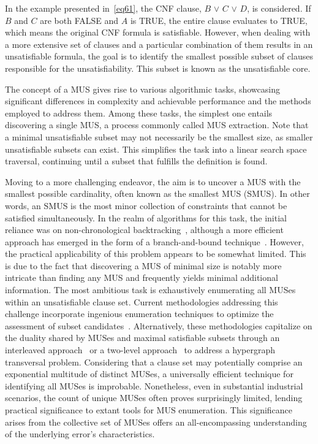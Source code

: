     In the example presented in~\eqref{eq61}, the CNF clause, $B$ $\vee$ $C$ $\vee$ $D$, is considered. If $B$ and $C$ are both FALSE and $A$ is TRUE, the entire clause evaluates to TRUE, which means the original CNF formula is satisfiable.
    However, when dealing with a more extensive set of clauses and a particular combination of them results in an unsatisfiable formula, the goal is to identify the smallest possible subset of clauses responsible for the unsatisfiability. This subset is known as the unsatisfiable core.
    
    The concept of a MUS gives rise to various algorithmic tasks, showcasing significant differences in complexity and achievable performance and the methods employed to address them. Among these tasks, the simplest one entails discovering a single MUS, a process commonly called MUS extraction. Note that a minimal unsatisfiable subset may not necessarily be the smallest size, as smaller unsatisfiable subsets can exist. This simplifies the task into a linear search space traversal, continuing until a subset that fulfills the definition is found. 

    Moving to a more challenging endeavor, the aim is to uncover a MUS with the smallest possible cardinality, often known as the smallest MUS (SMUS). In other words, an SMUS is the most minor collection of constraints that cannot be satisfied simultaneously.
    In the realm of algorithms for this task, the initial reliance was on non-chronological backtracking~\cite{lynce2004computing}, although a more efficient approach has emerged in the form of a branch-and-bound technique~\cite{mneimneh2005branch}. However, the practical applicability of this problem appears to be somewhat limited. This is due to the fact that discovering a MUS of minimal size is notably more intricate than finding any MUS and frequently yields minimal additional information.
    The most ambitious task is exhaustively enumerating all MUSes within an unsatisfiable clause set. Current methodologies addressing this challenge incorporate ingenious enumeration techniques to optimize the assessment of subset candidates~\cite{de2003finding}. Alternatively, these methodologies capitalize on the duality shared by MUSes and maximal satisfiable subsets through an interleaved approach~\cite{bailey2005discovery} or a two-level approach~\cite{liffiton2008algorithms} to address a hypergraph transversal problem. Considering that a clause set may potentially comprise an exponential multitude of distinct MUSes, a universally efficient technique for identifying all MUSes is improbable. Nonetheless, even in substantial industrial scenarios, the count of unique MUSes often proves surprisingly limited, lending practical significance to extant tools for MUS enumeration. This significance arises from the collective set of MUSes offers an all-encompassing understanding of the underlying error's characteristics.
    
